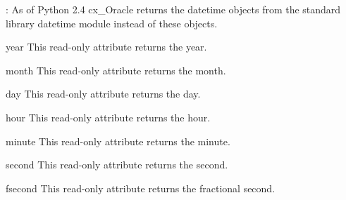 \documentclass{manual}
\begin{document}
: As of Python 2.4 cx_Oracle returns the datetime objects from the
standard library datetime module instead of these objects.

\begin{datadesc}{year}
  This read-only attribute returns the year.
\end{datadesc}

\begin{datadesc}{month}
  This read-only attribute returns the month.
\end{datadesc}

\begin{datadesc}{day}
  This read-only attribute returns the day.
\end{datadesc}

\begin{datadesc}{hour}
  This read-only attribute returns the hour.
\end{datadesc}

\begin{datadesc}{minute}
  This read-only attribute returns the minute.
\end{datadesc}

\begin{datadesc}{second}
  This read-only attribute returns the second.
\end{datadesc}

\begin{datadesc}{fsecond}
  This read-only attribute returns the fractional second.
\end{datadesc}


\end{document}
